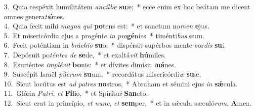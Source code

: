 {3.~}Quia respéxit humilitátem \textit{an}\textit{cíl}\textit{læ} \textbf{su}æ:~* ecce enim ex hoc beátam me dicent omnes genera\textit{ti}\textbf{ó}nes.\\
{4.~}Quia fecit mihi \textit{ma}\textit{gna} \textit{qui} \textbf{po}tens est:~* et sanctum no\textit{men} \textbf{e}jus.\\
{5.~}Et misericórdia ejus a progéni\textit{e} \textit{in} \textit{pro}\textbf{gé}nies~* timénti\textit{bus} \textbf{e}um.\\
{6.~}Fecit poténtiam in \textit{brá}\textit{chi}\textit{o} \textbf{su}o:~* dispérsit supérbos mente cor\textit{dis} \textbf{su}i.\\
{7.~}Depósuit po\textit{tén}\textit{tes} \textit{de} \textbf{se}de,~* et exaltá\textit{vit} \textbf{hú}miles.\\
{8.~}Esuriéntes \textit{im}\textit{plé}\textit{vit} \textbf{bo}nis:~* et dívites dimísit \textit{i}\textbf{ná}nes.\\
{9.~}Suscépit Israël \textit{pú}\textit{e}\textit{rum} \textbf{su}um,~* recordátus misericórdi\textit{æ} \textbf{su}æ.\\
{10.~}Sicut locútus est \textit{ad} \textit{pa}\textit{tres} \textbf{no}stros,~* Abraham et sémini ejus \textit{in} \textbf{sǽ}cula.\\
{11.~}Glória \textit{Pa}\textit{tri}, \textit{et} \textbf{Fí}lio,~* et Spirítu\textit{i} \textbf{San}cto.\\
{12.~}Sicut erat in princípio, \textit{et} \textit{nunc}, \textit{et} \textbf{sem}per,~* et in sǽcula sæculó\textit{rum}. \textbf{A}men.\\
